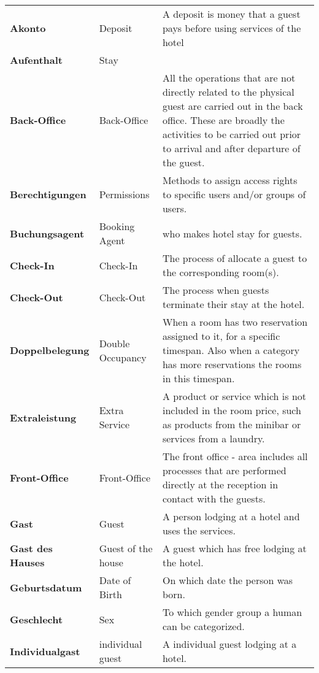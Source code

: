 \documentclass[../Pflichtenheft.tex]{subfiles}
\begin{document}
    \begin{longtable}{p{4cm} p{4cm} p{6cm}}
        \textbf{Akonto} & {Deposit} & A deposit is money that a guest pays before using services of the hotel \\[0.5cm]
        \textbf{Aufenthalt} & {Stay} &  \\[0.5cm]
        \textbf{Back-Office} & Back-Office & All the operations that are not directly related to the physical guest are carried out in the back office. These are broadly the activities to be carried out prior to arrival and after departure of the guest. \\[0.5cm]
        \textbf{Berechtigungen} & {Permissions} & Methods to assign access rights to specific users and/or groups of users. \\[0.5cm]
        \textbf{Buchungsagent} & {Booking Agent} & who makes hotel stay for guests. \\[0.5cm]
        \textbf{Check-In} & {Check-In} & The process of allocate a guest to the corresponding room(s). \\[0.5cm]
        \textbf{Check-Out} & {Check-Out} & The process when guests terminate their stay at the hotel. \\[0.5cm]
        \textbf{Doppelbelegung} & {Double Occupancy} & When a room has two reservation assigned to it, for a specific timespan. Also when a category has more reservations the rooms in this timespan. \\[0.5cm]
        \textbf{Extraleistung} & {Extra Service} & A product or service which is not included in the room price, such as products from the minibar or services from a laundry. \\[0.5cm]
        \textbf{Front-Office} & {Front-Office} & The front office - area includes all processes that are performed directly at the reception in contact with the guests. \\[0.5cm]
        \textbf{Gast} & {Guest} & A person lodging at a hotel and uses the services. \\[0.5cm]
        \textbf{Gast des Hauses} & {Guest of the house} & A guest which has free lodging at the hotel. \\[0.5cm]
        \textbf{Geburtsdatum} & {Date of Birth} & On which date the person was born. \\[0.5cm]
        \textbf{Geschlecht} & {Sex} & To which gender group a human can be categorized. \\[0.5cm]
        \textbf{Individualgast} & {individual guest} & A individual guest lodging at a hotel. \\[0.5cm]

\end{longtable}
\end{document}
